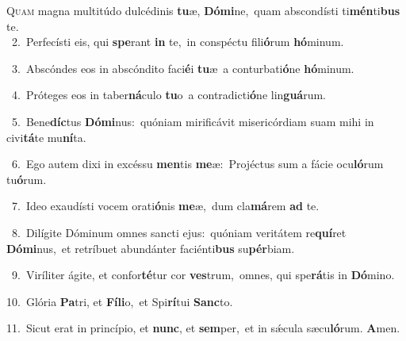 \lettrine{\initial\textcolor{\initialcolor}{Q}}{uam} magna multitúdo dulcédinis \textbf{tu}\-æ, \textbf{Dó}\-\textbf{mi}ne,~\star quam abscondísti ti\-\textbf{mén}\-ti\textbf{bus} te.\\
{\numbfont\textcolor{\numbcolor}{~2.}}~Perfecísti eis, qui \textbf{spe}\-rant \textbf{in} te,~\star in conspéctu fili\-\textbf{ó}\-rum \textbf{hó}\-minum.\par
{\numbfont\textcolor{\numbcolor}{~3.}}~Abscóndes eos in abscóndito faci\-\textbf{é}\-i \textbf{tu}\-æ~\star a conturbati\-\textbf{ó}\-ne \textbf{hó}\-minum.\par
{\numbfont\textcolor{\numbcolor}{~4.}}~Próteges eos in taber\-\textbf{ná}\-culo \textbf{tu}\-o~\star a contradicti\-\textbf{ó}\-ne lin\-\textbf{guá}\-rum.\par
{\numbfont\textcolor{\numbcolor}{~5.}}~Bene\-\textbf{díc}\-tus \textbf{Dó}\-\textbf{mi}nus:~\star quóniam mirificávit misericórdiam suam mihi in civi\-\textbf{tá}\-te mu\-\textbf{ní}\-ta.\par
{\numbfont\textcolor{\numbcolor}{~6.}}~Ego autem dixi in excéssu \textbf{men}\-tis \textbf{me}\-æ:~\star Projéctus sum a fácie ocu\-\textbf{ló}\-rum tu\-\textbf{ó}\-rum.\par
{\numbfont\textcolor{\numbcolor}{~7.}}~Ideo exaudísti vocem orati\-\textbf{ó}\-nis \textbf{me}\-æ,~\star dum cla\-\textbf{má}\-rem \textbf{ad} te.\par
{\numbfont\textcolor{\numbcolor}{~8.}}~Dilígite Dóminum omnes sancti ejus:~\dagger quóniam veritátem re\-\textbf{quí}\-ret \textbf{Dó}\-\textbf{mi}nus,~\star et retríbuet abundánter faciénti\textbf{bus} su\-\textbf{pér}\-biam.\par
{\numbfont\textcolor{\numbcolor}{~9.}}~Viríliter ágite, et confor\-\textbf{té}\-tur cor \textbf{ves}\-trum,~\star omnes, qui spe\-\textbf{rá}\-tis in \textbf{Dó}\-mino.\par
{\numbfont\textcolor{\numbcolor}{10.}}~Glória \textbf{Pa}\-tri, et \textbf{Fí}\-\textbf{li}o,~\star et Spi\-\textbf{rí}\-tui \textbf{Sanc}\-to.\par
{\numbfont\textcolor{\numbcolor}{11.}}~Sicut erat in princípio, et \textbf{nunc}\-, et \textbf{sem}\-per,~\star et in sǽcula sæcu\-\textbf{ló}\-rum. \textbf{A}\-men.\par
